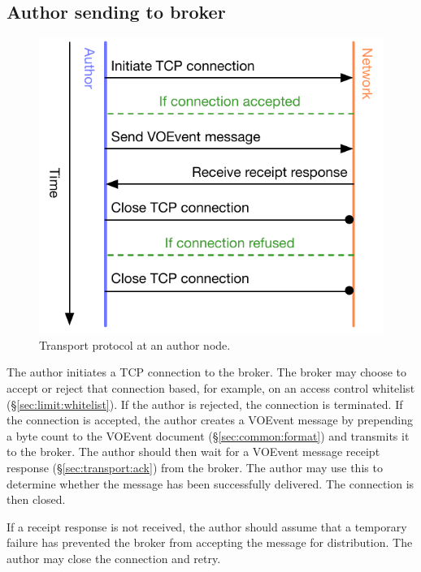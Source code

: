 \documentclass[a4paper,11pt]{ivoa}
\begin{document}
\subsection{Author sending to broker}
\label{sec:protocol:authortobroker}

\begin{figure}
  \begin{center}
  \includegraphics{figures/authortobroker.pdf}
  \end{center}

  \caption{Transport protocol at an author node.}

  \label{fig:protocol:authortobroker}
\end{figure}

The author initiates a TCP connection to the broker. The broker may choose to
accept or reject that connection based, for example, on an access control
whitelist (\S\ref{sec:limit:whitelist}). If the author is rejected, the
connection is terminated. If the connection is accepted, the author creates a
VOEvent message by prepending a byte count to the VOEvent document
(\S\ref{sec:common:format}) and transmits it to the broker. The author should
then wait for a VOEvent message receipt response (\S\ref{sec:transport:ack})
from the broker. The author may use this to determine whether the message
has been successfully delivered. The connection is then closed.

If a receipt response is not received, the author should assume that a
temporary failure has prevented the broker from accepting the message for
distribution. The author may close the connection and retry.
\end{document}

